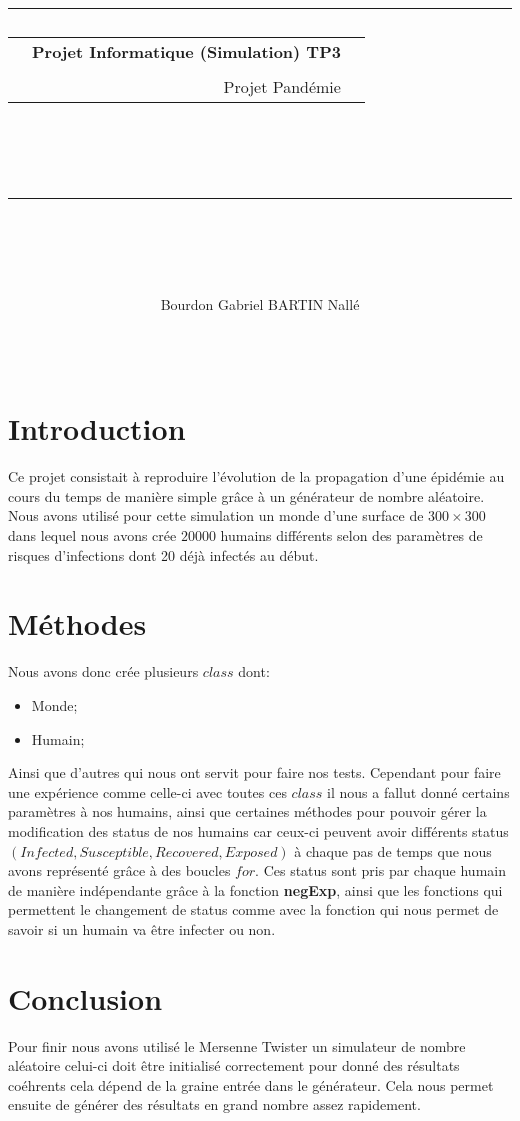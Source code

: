 \documentclass{article}
\title{
{\rule{\larg}{1mm}}\vspace{5mm}
\begin{tabular}{p{0cm} r c}
   & {\huge \textbf{Projet Informatique (Simulation) TP3}} \\
   & \\
   &{\huge Projet Pandémie}
\end{tabular}\\
\vspace{2mm}
{\rule{\larg}{1mm}}
\vspace{2mm} \\
}
\author{\begin{tabular}{p{13.7cm}}
Bourdon Gabriel \hspace{5cm} BARTIN Nallé 
\end{tabular}\\
\\ }\medskip
\begin{document}
\maketitle
\newpage
\tableofcontents
\newpage
\section{Introduction}
Ce projet consistait à reproduire l'évolution de la propagation d'une épidémie au cours du temps de manière simple grâce à un générateur de nombre aléatoire. Nous avons utilisé pour cette simulation un monde d'une surface de $300 \times 300$ dans lequel nous avons crée $20000$ humains différents selon des paramètres de risques d'infections dont 20 déjà infectés au début.

\section{Méthodes}
Nous avons donc crée plusieurs $class$ dont: \begin{itemize} \item Monde; \item Humain; \end{itemize}

Ainsi que d'autres qui nous ont servit pour faire nos tests. Cependant pour faire une expérience comme celle-ci avec toutes ces $class$ il nous a fallut donné certains paramètres à nos humains, ainsi que certaines méthodes pour pouvoir gérer la modification des status de nos humains car ceux-ci peuvent avoir différents status $(Infected, Susceptible, Recovered, Exposed)$ à chaque pas de temps que nous avons représenté grâce à des boucles $for$.
Ces status sont pris par chaque humain de manière indépendante grâce à la fonction \textbf{negExp}, ainsi que les fonctions qui permettent le changement de status comme avec la fonction qui nous permet de savoir si un humain va être infecter ou non.

\section{Conclusion}
Pour finir nous avons utilisé le Mersenne Twister un simulateur de nombre aléatoire celui-ci doit être initialisé correctement pour donné des résultats coéhrents cela dépend de la graine entrée dans le générateur.
Cela nous permet ensuite de générer des résultats en grand nombre assez rapidement.
\end{document}
